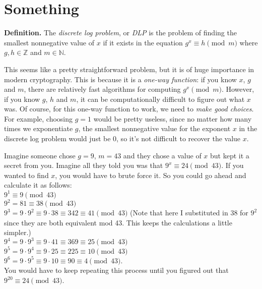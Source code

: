 \documentclass[14pt, letter]{amsart}
\begin{document}
\section{Something}






\noindent\textbf{Definition.} The \textit{discrete log problem}, or \textit{DLP} is the problem of finding the smallest nonnegative value of $x$ if it exists in the equation $g^x\equiv h\pmod{m}$ where $g, h\in\mathbb{Z}$ and $m\in\mathbb{N}$.

\vspace{0.2in}

This seems like a pretty straightforward problem, but it is of huge importance in modern cryptography. This is because it is a \textit{one-way function}: if you know $x$, $g$ and $m$, there are relatively fast algorithms for computing $g^x\pmod{m}$. However, if you know $g$, $h$ and $m$, it can be computationally difficult to figure out what $x$ was. Of course, for this one-way function to work, we need to \textit{make good choices}. For example, choosing $g=1$ would be pretty useless, since no matter how many times we exponentiate $g$, the smallest nonnegative value for the exponent $x$ in the discrete log problem would just be 0, so it's not difficult to recover the value $x$.

\vspace{0.2in}

Imagine someone chose $g=9$, $m=43$ and they chose a value of $x$ but kept it a secret from you. Imagine all they told you was that $9^x\equiv 24\pmod 43$. If you wanted to find $x$, you would have to brute force it. So you could go ahead and calculate it as follows:\\ 
$9^1\equiv 9\pmod{43}$\\
$9^2=81\equiv 38\pmod{43}$\\
$9^3=9\cdot9^2 \equiv 9\cdot 38\equiv 342\equiv 41 \pmod{43}$ (Note that here I substituted in 38 for $9^2$ since they are both equivalent mod 43. This keeps the calculations a little simpler.)\\
$9^4=9\cdot9^3 \equiv 9\cdot 41\equiv 369\equiv 25 \pmod{43}$\\
$9^5=9\cdot9^4 \equiv 9\cdot 25\equiv 225\equiv 10 \pmod{43}$\\
$9^6=9\cdot9^5 \equiv 9\cdot 10\equiv 90\equiv 4 \pmod{43}$.\\
You would have to keep repeating this process until you figured out that $9^{20}\equiv 24\pmod{43}$. 
\end{document}
